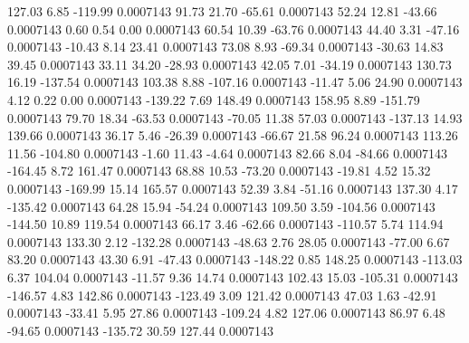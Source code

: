       127.03        6.85     -119.99     0.0007143
       91.73       21.70      -65.61     0.0007143
       52.24       12.81      -43.66     0.0007143
        0.60        0.54        0.00     0.0007143
       60.54       10.39      -63.76     0.0007143
       44.40        3.31      -47.16     0.0007143
      -10.43        8.14       23.41     0.0007143
       73.08        8.93      -69.34     0.0007143
      -30.63       14.83       39.45     0.0007143
       33.11       34.20      -28.93     0.0007143
       42.05        7.01      -34.19     0.0007143
      130.73       16.19     -137.54     0.0007143
      103.38        8.88     -107.16     0.0007143
      -11.47        5.06       24.90     0.0007143
        4.12        0.22        0.00     0.0007143
     -139.22        7.69      148.49     0.0007143
      158.95        8.89     -151.79     0.0007143
       79.70       18.34      -63.53     0.0007143
      -70.05       11.38       57.03     0.0007143
     -137.13       14.93      139.66     0.0007143
       36.17        5.46      -26.39     0.0007143
      -66.67       21.58       96.24     0.0007143
      113.26       11.56     -104.80     0.0007143
       -1.60       11.43       -4.64     0.0007143
       82.66        8.04      -84.66     0.0007143
     -164.45        8.72      161.47     0.0007143
       68.88       10.53      -73.20     0.0007143
      -19.81        4.52       15.32     0.0007143
     -169.99       15.14      165.57     0.0007143
       52.39        3.84      -51.16     0.0007143
      137.30        4.17     -135.42     0.0007143
       64.28       15.94      -54.24     0.0007143
      109.50        3.59     -104.56     0.0007143
     -144.50       10.89      119.54     0.0007143
       66.17        3.46      -62.66     0.0007143
     -110.57        5.74      114.94     0.0007143
      133.30        2.12     -132.28     0.0007143
      -48.63        2.76       28.05     0.0007143
      -77.00        6.67       83.20     0.0007143
       43.30        6.91      -47.43     0.0007143
     -148.22        0.85      148.25     0.0007143
     -113.03        6.37      104.04     0.0007143
      -11.57        9.36       14.74     0.0007143
      102.43       15.03     -105.31     0.0007143
     -146.57        4.83      142.86     0.0007143
     -123.49        3.09      121.42     0.0007143
       47.03        1.63      -42.91     0.0007143
      -33.41        5.95       27.86     0.0007143
     -109.24        4.82      127.06     0.0007143
       86.97        6.48      -94.65     0.0007143
     -135.72       30.59      127.44     0.0007143

